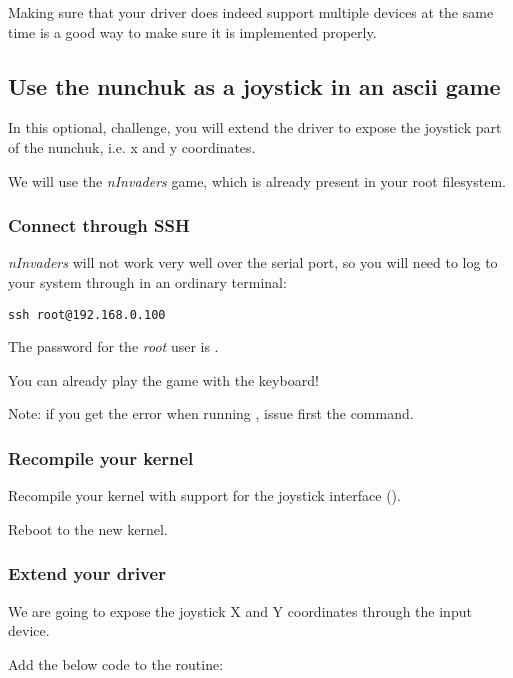 Making sure that your driver does indeed support multiple devices at the
same time is a good way to make sure it is implemented properly.

\subsection{Use the nunchuk as a joystick in an ascii game}

In this optional, challenge, you will extend the driver to expose
the joystick part of the nunchuk, i.e. x and y coordinates.

We will use the {\em nInvaders} game, which is already present in
your root filesystem.

\subsubsection{Connect through SSH}

{\em nInvaders} will not work very well over the serial port,
so you will need to log to your system through  in an
ordinary terminal:

\begin{verbatim}
ssh root@192.168.0.100
\end{verbatim}

The password for the {\em root} user is .

You can already play the  game with
the keyboard!

Note: if you get the error 
when running , issue first the
 command.

\subsubsection{Recompile your kernel}

Recompile your kernel with support for the joystick interface
().

Reboot to the new kernel.

\subsubsection{Extend your driver}

We are going to expose the joystick X and Y coordinates through
the input device.

Add the below code to the  routine:

